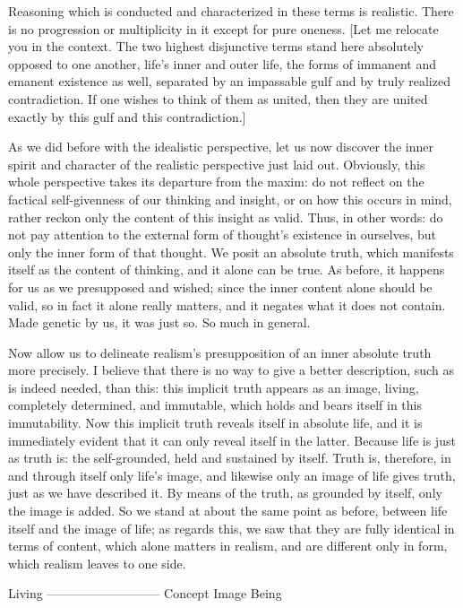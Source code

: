 Reasoning which is conducted and characterized
in these terms is realistic.
There is no progression or multiplicity
in it except for pure oneness.
[Let me relocate you in the context.
The two highest disjunctive terms stand
here absolutely opposed to one another,
life’s inner and outer life,
the forms of immanent and emanent existence as well,
separated by an impassable gulf
and by truly realized contradiction.
If one wishes to think of them as united,
then they are united exactly
by this gulf and this contradiction.]

As we did before with the idealistic perspective,
let us now discover the inner spirit and character
of the realistic perspective just laid out.
Obviously, this whole perspective takes
its departure from the maxim:
do not reflect on the factical self-givenness
of our thinking and insight,
or on how this occurs in mind,
rather reckon only the content of this insight as valid.
Thus, in other words:
do not pay attention to the external form
of thought’s existence in ourselves,
but only the inner form of that thought.
We posit an absolute truth,
which manifests itself as the content of thinking,
and it alone can be true.
As before, it happens for us as we presupposed and wished;
since the inner content alone should be valid,
so in fact it alone really matters,
and it negates what it does not contain.
Made genetic by us, it was just so.
So much in general.

Now allow us to delineate realism’s presupposition
of an inner absolute truth more precisely.
I believe that there is no way to give a better description,
such as is indeed needed, than this:
this implicit truth appears as an image,
living, completely determined, and immutable,
which holds and bears itself in this immutability.
Now this implicit truth reveals itself in absolute life,
and it is immediately evident that it can only
reveal itself in the latter.
Because life is just as truth is:
the self-grounded, held and sustained by itself.
Truth is, therefore, in and through itself only life’s image,
and likewise only an image of life gives truth,
just as we have described it.
By means of the truth, as grounded by itself,
only the image is added.
So we stand at about the
same point as before,
between life itself and the image of life;
as regards this, we saw that they are
fully identical in terms of content,
which alone matters in realism,
and are different only in form,
which realism leaves to one side.

Living
—————————
Concept Image Being

